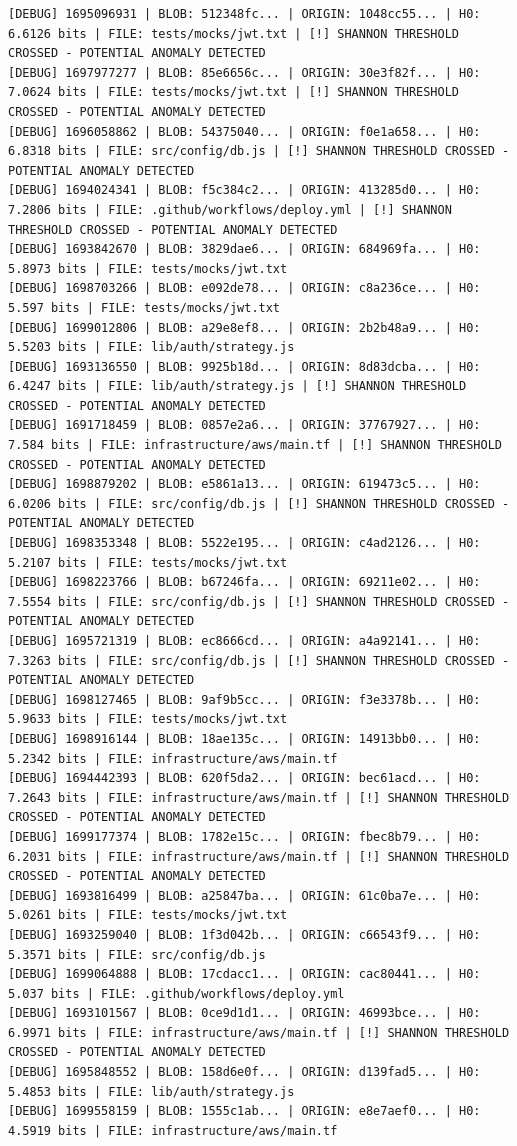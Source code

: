 \documentclass[12pt, a4paper, oneside]{report}
\begin{document}
\begin{lstlisting}[basicstyle=\tiny\ttfamily]
[DEBUG] 1695096931 | BLOB: 512348fc... | ORIGIN: 1048cc55... | H0: 6.6126 bits | FILE: tests/mocks/jwt.txt | [!] SHANNON THRESHOLD CROSSED - POTENTIAL ANOMALY DETECTED
[DEBUG] 1697977277 | BLOB: 85e6656c... | ORIGIN: 30e3f82f... | H0: 7.0624 bits | FILE: tests/mocks/jwt.txt | [!] SHANNON THRESHOLD CROSSED - POTENTIAL ANOMALY DETECTED
[DEBUG] 1696058862 | BLOB: 54375040... | ORIGIN: f0e1a658... | H0: 6.8318 bits | FILE: src/config/db.js | [!] SHANNON THRESHOLD CROSSED - POTENTIAL ANOMALY DETECTED
[DEBUG] 1694024341 | BLOB: f5c384c2... | ORIGIN: 413285d0... | H0: 7.2806 bits | FILE: .github/workflows/deploy.yml | [!] SHANNON THRESHOLD CROSSED - POTENTIAL ANOMALY DETECTED
[DEBUG] 1693842670 | BLOB: 3829dae6... | ORIGIN: 684969fa... | H0: 5.8973 bits | FILE: tests/mocks/jwt.txt
[DEBUG] 1698703266 | BLOB: e092de78... | ORIGIN: c8a236ce... | H0: 5.597 bits | FILE: tests/mocks/jwt.txt
[DEBUG] 1699012806 | BLOB: a29e8ef8... | ORIGIN: 2b2b48a9... | H0: 5.5203 bits | FILE: lib/auth/strategy.js
[DEBUG] 1693136550 | BLOB: 9925b18d... | ORIGIN: 8d83dcba... | H0: 6.4247 bits | FILE: lib/auth/strategy.js | [!] SHANNON THRESHOLD CROSSED - POTENTIAL ANOMALY DETECTED
[DEBUG] 1691718459 | BLOB: 0857e2a6... | ORIGIN: 37767927... | H0: 7.584 bits | FILE: infrastructure/aws/main.tf | [!] SHANNON THRESHOLD CROSSED - POTENTIAL ANOMALY DETECTED
[DEBUG] 1698879202 | BLOB: e5861a13... | ORIGIN: 619473c5... | H0: 6.0206 bits | FILE: src/config/db.js | [!] SHANNON THRESHOLD CROSSED - POTENTIAL ANOMALY DETECTED
[DEBUG] 1698353348 | BLOB: 5522e195... | ORIGIN: c4ad2126... | H0: 5.2107 bits | FILE: tests/mocks/jwt.txt
[DEBUG] 1698223766 | BLOB: b67246fa... | ORIGIN: 69211e02... | H0: 7.5554 bits | FILE: src/config/db.js | [!] SHANNON THRESHOLD CROSSED - POTENTIAL ANOMALY DETECTED
[DEBUG] 1695721319 | BLOB: ec8666cd... | ORIGIN: a4a92141... | H0: 7.3263 bits | FILE: src/config/db.js | [!] SHANNON THRESHOLD CROSSED - POTENTIAL ANOMALY DETECTED
[DEBUG] 1698127465 | BLOB: 9af9b5cc... | ORIGIN: f3e3378b... | H0: 5.9633 bits | FILE: tests/mocks/jwt.txt
[DEBUG] 1698916144 | BLOB: 18ae135c... | ORIGIN: 14913bb0... | H0: 5.2342 bits | FILE: infrastructure/aws/main.tf
[DEBUG] 1694442393 | BLOB: 620f5da2... | ORIGIN: bec61acd... | H0: 7.2643 bits | FILE: infrastructure/aws/main.tf | [!] SHANNON THRESHOLD CROSSED - POTENTIAL ANOMALY DETECTED
[DEBUG] 1699177374 | BLOB: 1782e15c... | ORIGIN: fbec8b79... | H0: 6.2031 bits | FILE: infrastructure/aws/main.tf | [!] SHANNON THRESHOLD CROSSED - POTENTIAL ANOMALY DETECTED
[DEBUG] 1693816499 | BLOB: a25847ba... | ORIGIN: 61c0ba7e... | H0: 5.0261 bits | FILE: tests/mocks/jwt.txt
[DEBUG] 1693259040 | BLOB: 1f3d042b... | ORIGIN: c66543f9... | H0: 5.3571 bits | FILE: src/config/db.js
[DEBUG] 1699064888 | BLOB: 17cdacc1... | ORIGIN: cac80441... | H0: 5.037 bits | FILE: .github/workflows/deploy.yml
[DEBUG] 1693101567 | BLOB: 0ce9d1d1... | ORIGIN: 46993bce... | H0: 6.9971 bits | FILE: infrastructure/aws/main.tf | [!] SHANNON THRESHOLD CROSSED - POTENTIAL ANOMALY DETECTED
[DEBUG] 1695848552 | BLOB: 158d6e0f... | ORIGIN: d139fad5... | H0: 5.4853 bits | FILE: lib/auth/strategy.js
[DEBUG] 1699558159 | BLOB: 1555c1ab... | ORIGIN: e8e7aef0... | H0: 4.5919 bits | FILE: infrastructure/aws/main.tf
\end{lstlisting}
\end{document}
